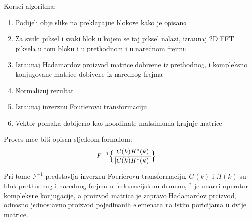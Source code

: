 Koraci algoritma:
\begin{enumerate}
\item Podijeli obje slike na preklapaju\cj e blokove kako je opisano
\item Za svaki piksel i svaki blok u kojem se taj piksel nalazi, izra\ch unaj 2D FFT piksela u tom bloku i u prethodnom i u narednom frejmu
\item Izra\ch unaj Hadamardov proizvod matrice dobivene iz prethodnog, i kompleksno konjugovane matrice dobivene iz narednog frejma
\item Normalizuj rezultat
\item Izra\ch unaj inverznu Fourierovu transformaciju
\item Vektor pomaka dobijemo kao koordinate maksimuma krajnje matrice
\end{enumerate}

Proces mo\zh e biti opisan sljede\cj om formulom:
\[
F^{-1}\Bigl\{\frac{G(k)H^*(k)}{|G(k)H^*(k)|}\Bigr\}
\]

Pri tome $F^{-1}$ predstavlja inverznu Fourierovu transformaciju, $G(k)$ i $H(k)$ su blok prethodnog i narednog frejma u frekvencijskom domenu, $^*$ je unarni operator kompleksne konjugacije, a proizvod matrica je zapravo Hadamardov
proizvod, odnosno jednostavno proizvod pojedina\ch nih elemenata na istim pozicijama u dvije matrice. 